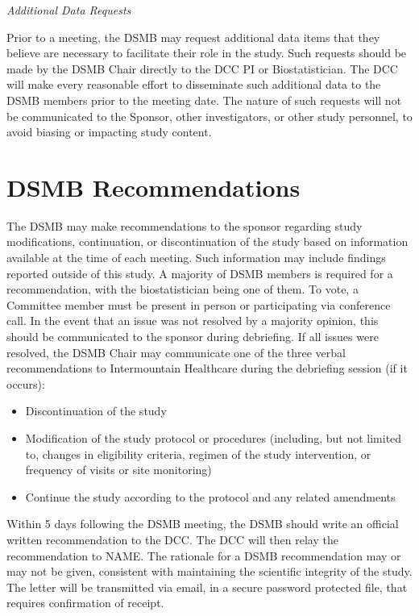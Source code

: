 \documentclass[12pt]{article}
\begin{document}
\vspace{0.4cm}
\noindent \textit{Additional Data Requests}

Prior to a meeting, the DSMB may request additional data items that they 
believe are necessary to facilitate their role in the study. Such requests 
should be made by the DSMB Chair directly to the DCC PI or Biostatistician. 
The DCC will make every reasonable effort to disseminate such additional 
data to the DSMB members prior to the meeting date. The nature of such 
requests will not be communicated to the Sponsor, other investigators, or 
other study personnel, to avoid biasing or impacting study content.


\section{DSMB Recommendations}
The DSMB may make recommendations to the sponsor regarding study 
modifications, continuation, or discontinuation of the study based on 
information available at the time of each meeting. Such information may 
include findings reported outside of this study. A majority of DSMB members 
is required for a recommendation, with the biostatistician being one of 
them. To vote, a Committee member must be present in person or participating 
via conference call. In the event that an issue was not resolved by a 
majority opinion, this should be communicated to the sponsor during 
debriefing.  If all issues were resolved, the DSMB Chair may communicate one 
of the three verbal recommendations to Intermountain Healthcare during the 
debriefing session (if it occurs):

\begin{itemize}
\item Discontinuation of the study
\item Modification of the study protocol or procedures (including, but not limited to, changes in eligibility criteria, regimen of the study intervention, or frequency of visits or site monitoring)
\item Continue the study according to the protocol and any related amendments
\end{itemize}

Within 5 days following the DSMB meeting, the DSMB should write an official 
written recommendation to the DCC. The DCC will then relay the 
recommendation to NAME. The rationale for a DSMB recommendation may or may 
not be given, consistent with maintaining the scientific integrity of the 
study.  The letter will be transmitted via email, in a secure password 
protected file, that requires confirmation of receipt. 
\end{document}
